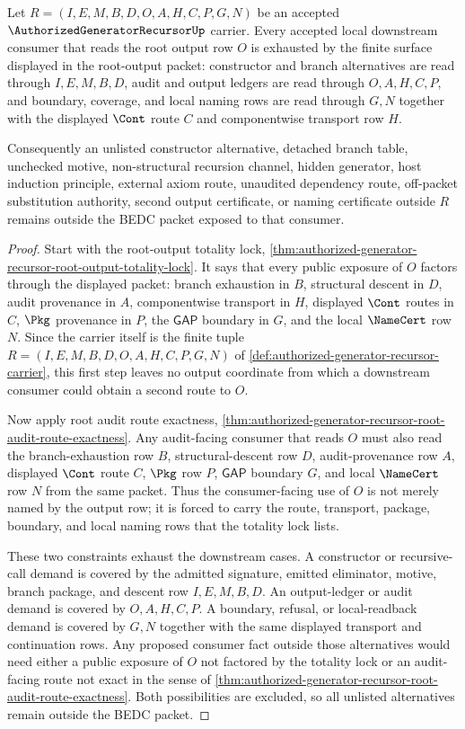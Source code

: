 \begin{lemma}
\label{lem:authorized-generator-recursor-root-output-totality-downstream-coverage}
Let $R=(I,E,M,B,D,O,A,H,C,P,G,N)$ be an accepted $\AuthorizedGeneratorRecursorUp$ carrier. Every accepted local downstream consumer that reads the root output row $O$ is exhausted by the finite surface displayed in the root-output packet: constructor and branch alternatives are read through $I,E,M,B,D$, audit and output ledgers are read through $O,A,H,C,P$, and boundary, coverage, and local naming rows are read through $G,N$ together with the displayed $\Cont$ route $C$ and componentwise transport row $H$.

Consequently an unlisted constructor alternative, detached branch table, unchecked motive, non-structural recursion channel, hidden generator, host induction principle, external axiom route, unaudited dependency route, off-packet substitution authority, second output certificate, or naming certificate outside $R$ remains outside the BEDC packet exposed to that consumer.
\end{lemma}
\begin{proof}
Start with the root-output totality lock, \autoref{thm:authorized-generator-recursor-root-output-totality-lock}. It says that every public exposure of $O$ factors through the displayed packet: branch exhaustion in $B$, structural descent in $D$, audit provenance in $A$, componentwise transport in $H$, displayed $\Cont$ routes in $C$, $\Pkg$ provenance in $P$, the $\mathsf{GAP}$ boundary in $G$, and the local $\NameCert$ row $N$. Since the carrier itself is the finite tuple $R=(I,E,M,B,D,O,A,H,C,P,G,N)$ of \autoref{def:authorized-generator-recursor-carrier}, this first step leaves no output coordinate from which a downstream consumer could obtain a second route to $O$.

Now apply root audit route exactness, \autoref{thm:authorized-generator-recursor-root-audit-route-exactness}. Any audit-facing consumer that reads $O$ must also read the branch-exhaustion row $B$, structural-descent row $D$, audit-provenance row $A$, displayed $\Cont$ route $C$, $\Pkg$ row $P$, $\mathsf{GAP}$ boundary $G$, and local $\NameCert$ row $N$ from the same packet. Thus the consumer-facing use of $O$ is not merely named by the output row; it is forced to carry the route, transport, package, boundary, and local naming rows that the totality lock lists.

These two constraints exhaust the downstream cases. A constructor or recursive-call demand is covered by the admitted signature, emitted eliminator, motive, branch package, and descent row $I,E,M,B,D$. An output-ledger or audit demand is covered by $O,A,H,C,P$. A boundary, refusal, or local-readback demand is covered by $G,N$ together with the same displayed transport and continuation rows. Any proposed consumer fact outside those alternatives would need either a public exposure of $O$ not factored by the totality lock or an audit-facing route not exact in the sense of \autoref{thm:authorized-generator-recursor-root-audit-route-exactness}. Both possibilities are excluded, so all unlisted alternatives remain outside the BEDC packet.
\end{proof}
